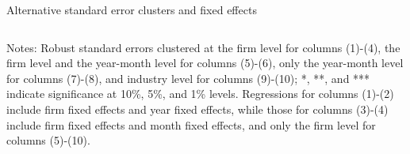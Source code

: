 \documentclass[10pt]{beamer}
\begin{document}
\begin{frame}{Alternative standard error clusters and fixed effects}
\begin{table}[htbp]
{\begin{threeparttable}
\begin{tabular}{lcccccccccc}
        \end{tabular}
        \begin{tablenotes}
            \footnotesize
            \item Notes: Robust standard errors clustered at the firm level for columns (1)-(4), the firm level and the year-month level for columns (5)-(6), only the year-month level for columns (7)-(8), and industry level for columns (9)-(10);  *, **, and *** indicate significance at 10\%, 5\%, and 1\% levels. Regressions for columns (1)-(2) include firm fixed effects and year fixed effects, while those for columns (3)-(4) include firm fixed effects and month fixed effects, and only the firm level for columns (5)-(10).
        \end{tablenotes}
        \end{threeparttable}
        }
    \end{table}
    \hyperlink{robustness_other}{}
\end{frame}
\end{document}
